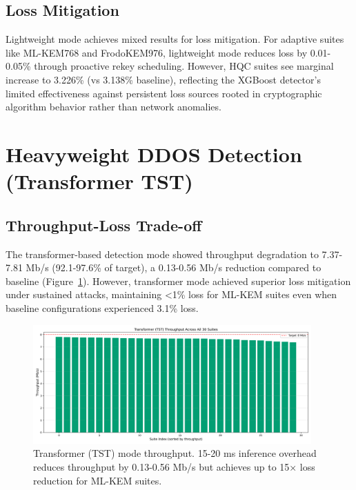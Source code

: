 \documentclass[11pt,a4paper]{article}
\begin{document}
\subsection{Loss Mitigation}

Lightweight mode achieves mixed results for loss mitigation. For adaptive suites like ML-KEM768 and FrodoKEM976, lightweight mode reduces loss by 0.01-0.05\% through proactive rekey scheduling. However, HQC suites see marginal increase to 3.226\% (vs 3.138\% baseline), reflecting the XGBoost detector's limited effectiveness against persistent loss sources rooted in cryptographic algorithm behavior rather than network anomalies.

\section{Heavyweight DDOS Detection (Transformer TST)}

\subsection{Throughput-Loss Trade-off}

The transformer-based detection mode showed throughput degradation to 7.37-7.81 Mb/s (92.1-97.6\% of target), a 0.13-0.56 Mb/s reduction compared to baseline (Figure~\ref{fig:throughput_transformer}). However, transformer mode achieved superior loss mitigation under sustained attacks, maintaining <1\% loss for ML-KEM suites even when baseline configurations experienced 3.1\% loss.

\begin{figure}[H]
\centering
\includegraphics[width=0.95\textwidth]{../figures/figure03_throughput_all_suites_transformer.png}
\caption{Transformer (TST) mode throughput. 15-20 ms inference overhead reduces throughput by 0.13-0.56 Mb/s but achieves up to 15× loss reduction for ML-KEM suites.}
\label{fig:throughput_transformer}
\end{figure}
\end{document}
